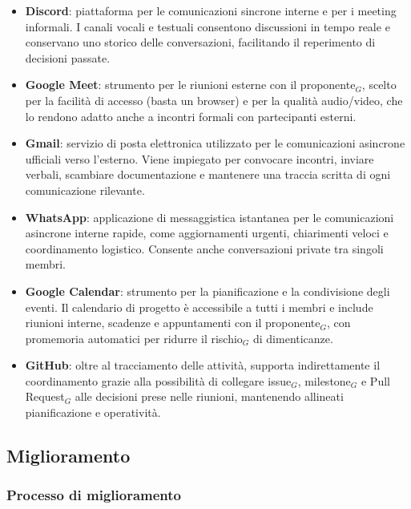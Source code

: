 \documentclass[a4paper, 10pt]{article}
\begin{document}
\begin{itemize}
    \item \textbf{Discord}: piattaforma per le comunicazioni sincrone interne e per i meeting informali. I canali vocali e testuali consentono discussioni in tempo reale e conservano uno storico delle conversazioni, facilitando il reperimento di decisioni passate.
    \item \textbf{Google Meet}: strumento per le riunioni esterne con il proponente$_G$, scelto per la facilità di accesso (basta un browser) e per la qualità audio/video, che lo rendono adatto anche a incontri formali con partecipanti esterni.
    \item \textbf{Gmail}: servizio di posta elettronica utilizzato per le comunicazioni asincrone ufficiali verso l'esterno. Viene impiegato per convocare incontri, inviare verbali, scambiare documentazione e mantenere una traccia scritta di ogni comunicazione rilevante.
    \item \textbf{WhatsApp}: applicazione di messaggistica istantanea per le comunicazioni asincrone interne rapide, come aggiornamenti urgenti, chiarimenti veloci e coordinamento logistico. Consente anche conversazioni private tra singoli membri.
    \item \textbf{Google Calendar}: strumento per la pianificazione e la condivisione degli eventi. Il calendario di progetto è accessibile a tutti i membri e include riunioni interne, scadenze e appuntamenti con il proponente$_G$, con promemoria automatici per ridurre il rischio$_G$ di dimenticanze.
    \item \textbf{GitHub}: oltre al tracciamento delle attività, supporta indirettamente il coordinamento grazie alla possibilità di collegare issue$_G$, milestone$_G$ e Pull Request$_G$ alle decisioni prese nelle riunioni, mantenendo allineati pianificazione e operatività.
\end{itemize}

\subsection{Miglioramento}
\label{subsec:miglioramento}

\subsubsection{Processo di miglioramento}
\label{subsubsec:processo_miglioramento}
\end{document}
